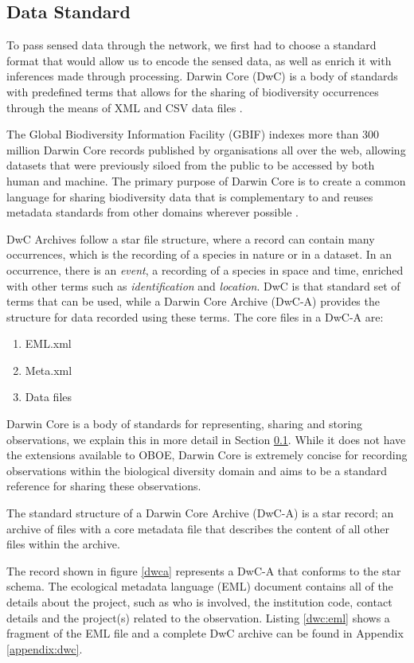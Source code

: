 	\subsection{Data Standard}\label{arch:tech:dwc}
		To pass sensed data through the network, we first had to choose a standard format that would allow us to encode the sensed data, as well as enrich it with inferences made through processing. Darwin Core (DwC) is a body of standards with predefined terms that allows for the sharing of biodiversity occurrences through the means of XML and CSV data files \cite{Wieczorek2012b}.

The Global Biodiversity Information Facility (GBIF) indexes more than 300 million Darwin Core records published by organisations all over the web, allowing datasets that were previously siloed from the public to be accessed by both human and machine. The primary purpose of Darwin Core is to create a common language for sharing biodiversity data that is complementary to and reuses metadata standards from other domains wherever possible \cite{Wieczorek2012a}.

DwC Archives follow a star file structure, where a record can contain many occurrences, which is the recording of a species in nature or in a dataset. In an occurrence, there is an \textit{event}, a recording of a species in space and time, enriched with other terms such as \textit{identification} and \textit{location}. DwC is that standard set of terms that can be used, while a Darwin Core Archive (DwC-A) provides the structure for data recorded using these terms. The core files in a DwC-A are:
\begin{enumerate}
	\item EML.xml
	\item Meta.xml
	\item Data files
\end{enumerate}
Darwin Core is a body of standards for representing, sharing and storing observations, we explain this in more detail in Section \ref{arch:tech:dwc}. While it does not have the extensions available to OBOE, Darwin Core is extremely concise for recording observations within the biological diversity domain and aims to be a standard reference for sharing these observations.

The standard structure of a Darwin Core Archive (DwC-A) is a star record; an archive of files with a core metadata file that describes the content of all other files within the archive.

The record shown in figure \ref{dwca} represents a DwC-A that conforms to the star schema. The ecological metadata language (EML) document contains all of the details about the project, such as who is involved, the institution code, contact details and the project(s) related to the observation. Listing \ref{dwc:eml} shows a fragment of the EML file and a complete DwC archive can be found in Appendix \ref{appendix:dwc}.

